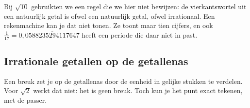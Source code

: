 
Bij $\sqrt{10}$ gebruikten we een regel die we hier niet bewijzen: de vierkantswortel uit een natuurlijk getal is ofwel een natuurlijk getal, ofwel irrationaal. Een rekenmachine kan je dat niet tonen. Ze toont maar tien cijfers, en ook $\tfrac{1}{17} = 0,\overline{0588235294117647}$ heeft een periode die daar niet in past.

\begin{oefeningen}
\end{oefeningen}

\subsection{Irrationale getallen op de getallenas}

Een breuk zet je op de getallenas door de eenheid in gelijke stukken te verdelen. Voor $\sqrt2$ werkt dat niet: het is geen breuk. Toch kun je het punt exact tekenen, met de passer.

